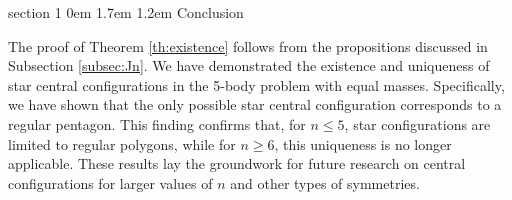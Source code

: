 \documentclass[final,11pt]{article}
\makeatletter
\renewcommand{\section}{\@startsection%
{section}%
{1}%
{0em}%
{1.7em}%
{1.2em}%
{\normalfont\large\centering\bfseries}}
\numberwithin{equation}{section}
\theoremstyle{definition}
\makeatother
\begin{document}
\section{Conclusion}

The proof of Theorem \ref{th:existence} follows from the propositions discussed in Subsection \ref{subsec:Jn}. We have demonstrated the existence and uniqueness of star central configurations in the 5-body problem with equal masses. Specifically, we have shown that the only possible star central configuration corresponds to a regular pentagon. This finding confirms that, for $n \leq 5$, star configurations are limited to regular polygons, while for $n \geq 6$, this uniqueness is no longer applicable. These results lay the groundwork for future research on central configurations for larger values of $n$ and other types of symmetries.
%
%
%
\end{document}

